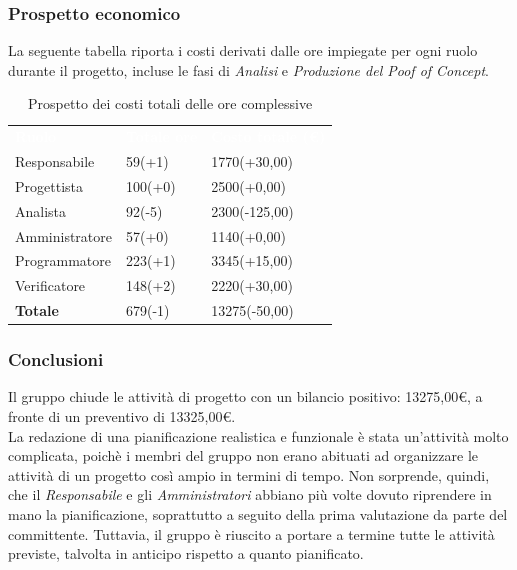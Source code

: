 \subsubsection{Prospetto economico}
La seguente tabella riporta i costi derivati dalle ore impiegate per ogni ruolo durante il progetto, incluse le fasi di \textit{Analisi} e \textit{Produzione del Poof of Concept}.

\begin{table}[H]
\begin{center}
\renewcommand{\arraystretch}{1.5}
\begin{tabular}{ m{}<{\centering}  m{}<{\centering} m{}<{\centering}}
	\rowcolor{darkblue}
	\textcolor{white}{\textbf{Ruolo}}&\textcolor{white}{\textbf{Totale ore}}&\textcolor{white}{\textbf{Costo totale (\euro)}}\\ 

	Responsabile & 59(+1) & 1770(+30,00) \\	
	
	Progettista & 100(+0) & 2500(+0,00) \\
	
	Analista & 92(-5) & 2300(-125,00) \\

	Amministratore & 57(+0) & 1140(+0,00) \\
	
	Programmatore & 223(+1) & 3345(+15,00) \\
	
	Verificatore & 148(+2) & 2220(+30,00) \\
	
	\textbf{Totale} & 679(-1) & 13275(-50,00) \\
	
\end{tabular}
\caption{Prospetto dei costi totali delle ore complessive}
\end{center}
\end{table}


\subsubsection{Conclusioni}
Il gruppo chiude le attività di progetto con un bilancio positivo: 13275,00\euro, a fronte di un preventivo di 13325,00\euro. \\

La redazione di una pianificazione realistica e funzionale è stata un'attività molto complicata, poichè i membri del gruppo non erano abituati ad organizzare le attività di un progetto così ampio in termini di tempo. Non sorprende, quindi, che il \textit{Responsabile} e gli \textit{Amministratori} abbiano più volte dovuto riprendere in mano la pianificazione, soprattutto a seguito della prima valutazione da parte del committente. Tuttavia, il gruppo è riuscito a portare a termine tutte le attività previste, talvolta in anticipo rispetto a quanto pianificato.

